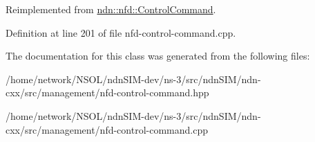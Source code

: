 Reimplemented from \hyperlink{classndn_1_1nfd_1_1ControlCommand_a479414f06f65e7ad819c94e365fa0981}{ndn\+::nfd\+::\+Control\+Command}.



Definition at line 201 of file nfd-\/control-\/command.\+cpp.



The documentation for this class was generated from the following files\+:\begin{DoxyCompactItemize}
\item 
/home/network/\+N\+S\+O\+L/ndn\+S\+I\+M-\/dev/ns-\/3/src/ndn\+S\+I\+M/ndn-\/cxx/src/management/nfd-\/control-\/command.\+hpp\item 
/home/network/\+N\+S\+O\+L/ndn\+S\+I\+M-\/dev/ns-\/3/src/ndn\+S\+I\+M/ndn-\/cxx/src/management/nfd-\/control-\/command.\+cpp\end{DoxyCompactItemize}
